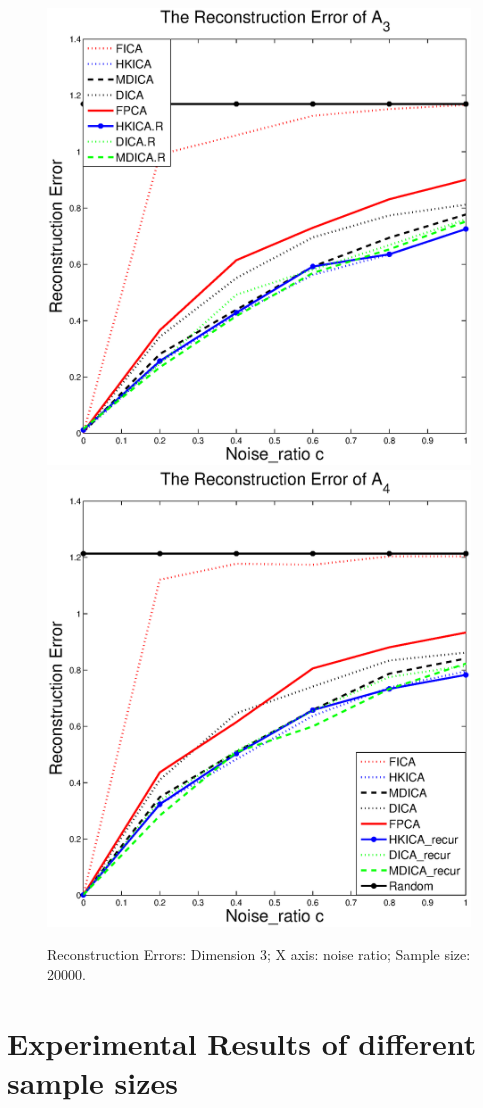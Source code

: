 \begin{figure}[t]
	\includegraphics[width =0.45\columnwidth]{error3_d3}  \\
	\includegraphics[width =0.45\columnwidth]{error4_d3}
\caption{
\label{fig:Error_d3}
 Reconstruction Errors: Dimension 3; X axis: noise ratio; Sample size: 20000.}
\end{figure}

\section{Experimental Results of different sample sizes}
